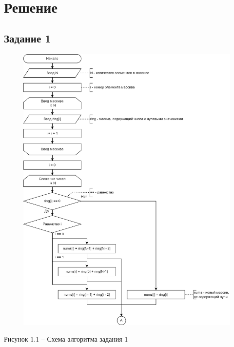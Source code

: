 \documentclass[a4paper,14pt]{extarticle}
\begin{document}
  \newpage
  \section*{Решение}
  \subsection*{Задание 1}
  \begin{figure}[h]
    \centering
    \includegraphics[width=0.89\linewidth]{schemes/s-1-1}
  \end{figure}
  \begin{center}
    Рисунок 1.1 – Схема алгоритма задания 1
  \end{center}
\end{document}
